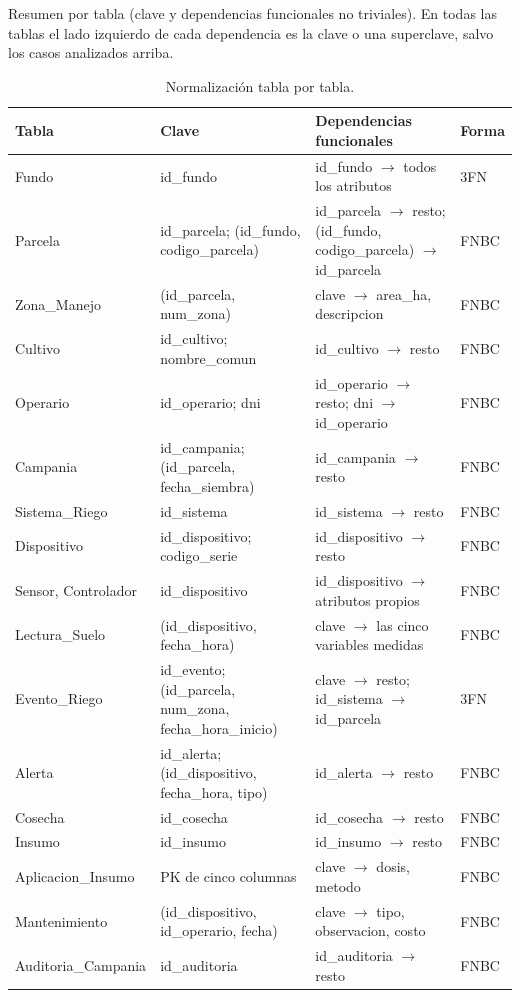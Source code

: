 Resumen por tabla (clave y dependencias funcionales no triviales). En todas las tablas el lado izquierdo de cada dependencia es la clave o una superclave, salvo los casos analizados arriba.

\begin{table}[H]
\centering\footnotesize
\begin{tabularx}{\textwidth}{>{\raggedright\arraybackslash}p{3.2cm}>{\raggedright\arraybackslash}p{3.6cm}>{\raggedright\arraybackslash}X>{\centering\arraybackslash}p{1.2cm}}
\toprule
\textbf{Tabla} & \textbf{Clave} & \textbf{Dependencias funcionales} & \textbf{Forma} \\
\midrule
Fundo & id\_fundo & id\_fundo $\to$ todos los atributos & 3FN \\
Parcela & id\_parcela; (id\_fundo, codigo\_parcela) & id\_parcela $\to$ resto; (id\_fundo, codigo\_parcela) $\to$ id\_parcela & FNBC \\
Zona\_Manejo & (id\_parcela, num\_zona) & clave $\to$ area\_ha, descripcion & FNBC \\
Cultivo & id\_cultivo; nombre\_comun & id\_cultivo $\to$ resto & FNBC \\
Operario & id\_operario; dni & id\_operario $\to$ resto; dni $\to$ id\_operario & FNBC \\
Campania & id\_campania; (id\_parcela, fecha\_siembra) & id\_campania $\to$ resto & FNBC \\
Sistema\_Riego & id\_sistema & id\_sistema $\to$ resto & FNBC \\
Dispositivo & id\_dispositivo; codigo\_serie & id\_dispositivo $\to$ resto & FNBC \\
Sensor, Controlador & id\_dispositivo & id\_dispositivo $\to$ atributos propios & FNBC \\
Lectura\_Suelo & (id\_dispositivo, fecha\_hora) & clave $\to$ las cinco variables medidas & FNBC \\
Evento\_Riego & id\_evento; (id\_parcela, num\_zona, fecha\_hora\_inicio) & clave $\to$ resto; id\_sistema $\to$ id\_parcela & 3FN \\
Alerta & id\_alerta; (id\_dispositivo, fecha\_hora, tipo) & id\_alerta $\to$ resto & FNBC \\
Cosecha & id\_cosecha & id\_cosecha $\to$ resto & FNBC \\
Insumo & id\_insumo & id\_insumo $\to$ resto & FNBC \\
Aplicacion\_Insumo & PK de cinco columnas & clave $\to$ dosis, metodo & FNBC \\
Mantenimiento & (id\_dispositivo, id\_operario, fecha) & clave $\to$ tipo, observacion, costo & FNBC \\
Auditoria\_Campania & id\_auditoria & id\_auditoria $\to$ resto & FNBC \\
\bottomrule
\end{tabularx}
\caption{Normalización tabla por tabla.}
\end{table}

